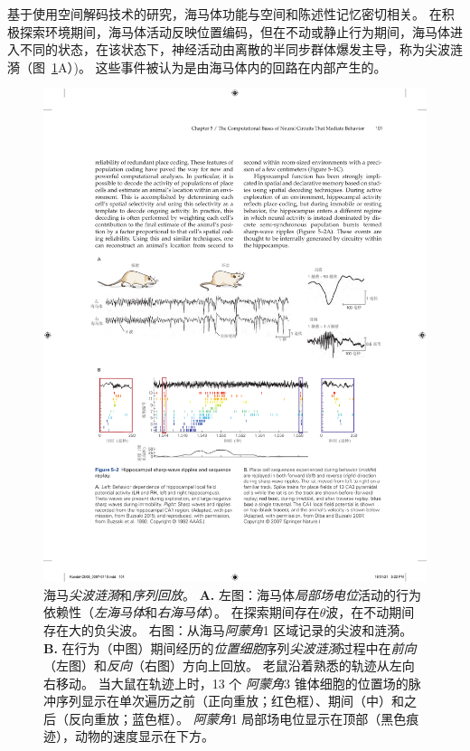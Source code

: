 基于使用空间解码技术的研究，海马体功能与空间和陈述性记忆密切相关。
在积极探索环境期间，海马体活动反映位置编码，但在不动或静止行为期间，海马体进入不同的状态，在该状态下，神经活动由离散的半同步群体爆发主导，称为尖波涟漪（图~\ref{fig:5_2}A）)。
这些事件被认为是由海马体内的回路在内部产生的。


\begin{figure}[htbp]
	\centering
	\includegraphics[width=1.0\linewidth]{chap05/fig_5_2}
	\caption{海马\textit{尖波涟漪}和\textit{序列回放}。 
		\textbf{A.} 左图：海马体\textit{局部场电位}活动的行为依赖性（\textit{左海马体}和\textit{右海马体}）。
		在探索期间存在$\theta$波，在不动期间存在大的负尖波。 
		右图：从海马\textit{阿蒙角}1 区域记录的尖波和涟漪\cite{buzsaki2015hippocampal,buzsaki1992high}。
		\textbf{B.} 在行为（中图）期间经历的\textit{位置细胞}序列\textit{尖波涟漪}过程中在\textit{前向}（左图）和\textit{反向}（右图）方向上回放。
		老鼠沿着熟悉的轨迹从左向右移动。
		当大鼠在轨迹上时，13 个 \textit{阿蒙角}3 锥体细胞的位置场的脉冲序列显示在单次遍历之前（正向重放；红色框）、期间（中）和之后（反向重放；蓝色框）。
		\textit{阿蒙角}1 局部场电位显示在顶部（黑色痕迹），动物的速度显示在下方\cite{diba2007forward}。}
	\label{fig:5_2}
\end{figure}


